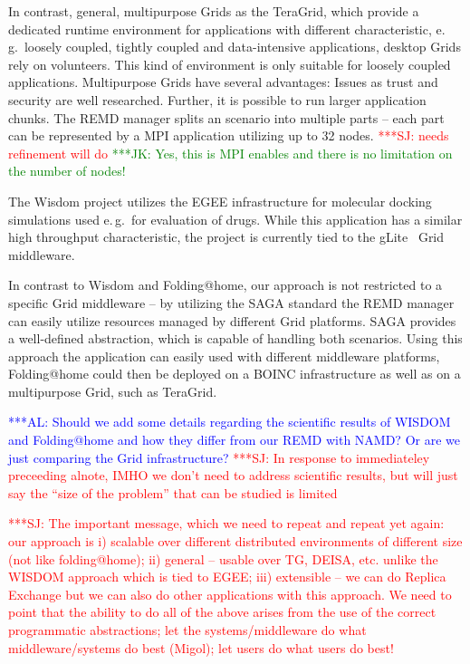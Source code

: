 \documentclass[times, 10pt,twocolumn]{article}
\newcommand{\kimnote}[1]{ {\textcolor{green} { ***JK: #1 }}}
\newcommand{\alnote}[1]{ {\textcolor{blue} { ***AL: #1 }}}
\newcommand{\jhanote}[1]{ {\textcolor{red} { ***SJ: #1 }}}
\newcommand{\kimnote}[1]{}
\newcommand{\alnote}[1]{}
\newcommand{\jhanote}[1]{}
\begin{document}
In contrast, general, multipurpose Grids as the TeraGrid, which
provide a dedicated runtime environment for applications with
different characteristic, e.\,g.\ loosely coupled, tightly coupled and
data-intensive applications, desktop Grids rely on volunteers. This
kind of environment is only suitable for loosely coupled
applications. Multipurpose Grids have several advantages: Issues as
trust and security are well researched. Further, it is possible to run
larger application chunks. The REMD manager splits an scenario into
multiple parts -- each part can be represented by a MPI application
utilizing up to 32 nodes. \jhanote{needs refinement will do}
\kimnote{Yes, this is MPI enables and there is no limitation on the
  number of nodes!}

The Wisdom project utilizes the EGEE infrastructure for molecular
docking simulations used e.\,g.\ for evaluation of drugs. While this
application has a similar high throughput characteristic, the project
is currently tied to the gLite~\cite{glite2008} Grid middleware.

In contrast to Wisdom and Folding@home, our approach is not restricted
to a specific Grid middleware -- by utilizing the SAGA standard the
REMD manager can easily utilize resources managed by different Grid
platforms. SAGA provides a well-defined abstraction, which is capable
of handling both scenarios. Using this approach the application can
easily used with different middleware platforms, Folding@home could
then be deployed on a BOINC infrastructure as well as on a
multipurpose Grid, such as TeraGrid.

\alnote{Should we add some details regarding the scientific results of
  WISDOM and Folding@home and how they differ from our REMD with NAMD?
  Or are we just comparing the Grid infrastructure?}  \jhanote{In
  response to immediateley preceeding alnote, IMHO we don't need to
  address scientific results, but will just say the ``size of the
  problem'' that can be studied is limited}

  \jhanote{The important message, which we need to repeat and repeat
    yet again: our approach is i) scalable over different distributed
    environments of different size (not like folding@home); ii)
    general -- usable over TG, DEISA, etc. unlike the WISDOM approach
    which is tied to EGEE; iii) extensible -- we can do Replica
    Exchange but we can also do other applications with this
    approach. We need to point that the ability to do all of the above
    arises from the use of the correct programmatic abstractions; let
    the systems/middleware do what middleware/systems do best (Migol);
    let users do what users do best!}
\end{document}
